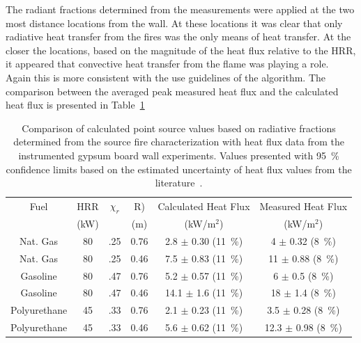 \documentclass[twoside]{uocthesis}
\begin{document}
{The radiant fractions determined from the measurements were applied at the two most distance locations from the wall.  At these locations it was clear that only radiative heat transfer from the fires was the only means of heat transfer.  At the closer the locations, based on the magnitude of the heat flux relative to the HRR, it appeared that convective heat transfer from the flame was playing a role.  Again this is more consistent with the use guidelines of the algorithm. The comparison between the averaged peak measured heat flux and the calculated heat flux is presented in Table~\ref{tab:Point_Source_ModChir} 

\begin{table}
	\centering
	\footnotesize
	\begin{tabular}{|c|c|c|c|c|c|}
	\hline
		Fuel 		& HRR  &   $\chi_r$   & R)	     & Calculated Heat Flux      & Measured Heat Flux      \\     
					& (kW) &  			  & (m)		&  (kW/m$^2$)				&   (kW/m$^2$)                        \\ \hline 
		Nat. Gas 	& 80       &   .25 	& 0.76 	     & 2.8 $\pm$ 0.30 (11~\%) 				&  4 $\pm$ 0.32 (8~\%) 	   	 \\
		Nat. Gas 	& 80       &   .25  & 0.46	     & 7.5 $\pm$ 0.83 (11~\%) 				&  11 $\pm$ 0.88 (8~\%)  	     \\
		Gasoline 	& 80       &   .47 	& 0.76	     & 5.2 $\pm$ 0.57 (11~\%) 				&  6 $\pm$ 0.5 (8~\%)   	      \\
        Gasoline 	& 80       &   .47 	& 0.46	     & 14.1 $\pm$ 1.6 (11~\%) 				&  18 $\pm$ 1.4 (8~\%)		      \\
       Polyurethane & 45       &   .33 	& 0.76	     & 2.1 $\pm$ 0.23 (11~\%) 				&  3.5 $\pm$ 0.28 (8~\%)   	       \\
       Polyurethane & 45       &   .33 	& 0.46	     & 5.6 $\pm$ 0.62 (11~\%) 				& 12.3 $\pm$ 0.98 (8~\%)   	       \\
	\hline
	\end{tabular}
	\caption[Comparison of calculated point source values based on radiative fractions determined from the source fire characterization with heat flux data from the instrumented gypsum board wall experiments]{Comparison of calculated point source values based on radiative fractions determined from the source fire characterization with heat flux data from the instrumented gypsum board wall experiments.  Values presented with 95~\% confidence limits based on the estimated uncertainty of heat flux values from the literature~\cite{Bryant:2003,Pitts:2006}.}
	\label{tab:Point_Source_ModChir}
\end{table}

}
\end{document}
